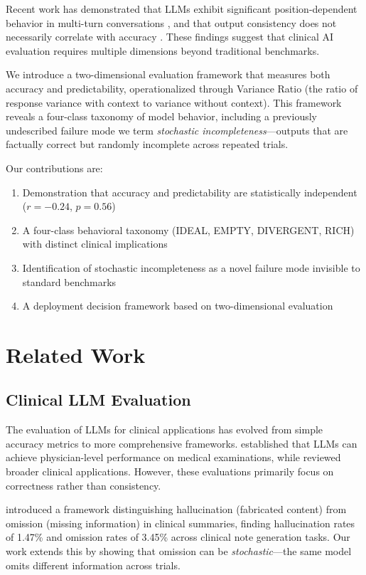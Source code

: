 \documentclass[11pt]{article}
\begin{document}
Recent work has demonstrated that LLMs exhibit significant position-dependent behavior in multi-turn conversations \citep{liu2024lost, laban2025lost}, and that output consistency does not necessarily correlate with accuracy \citep{shyr2025statistical}. These findings suggest that clinical AI evaluation requires multiple dimensions beyond traditional benchmarks.

We introduce a two-dimensional evaluation framework that measures both accuracy and predictability, operationalized through Variance Ratio (the ratio of response variance with context to variance without context). This framework reveals a four-class taxonomy of model behavior, including a previously undescribed failure mode we term \textit{stochastic incompleteness}---outputs that are factually correct but randomly incomplete across repeated trials.

Our contributions are:
\begin{enumerate}
    \item Demonstration that accuracy and predictability are statistically independent ($r = -0.24$, $p = 0.56$)
    \item A four-class behavioral taxonomy (IDEAL, EMPTY, DIVERGENT, RICH) with distinct clinical implications
    \item Identification of stochastic incompleteness as a novel failure mode invisible to standard benchmarks
    \item A deployment decision framework based on two-dimensional evaluation
\end{enumerate}

\section{Related Work}

\subsection{Clinical LLM Evaluation}

The evaluation of LLMs for clinical applications has evolved from simple accuracy metrics to more comprehensive frameworks. \citet{singhal2023large} established that LLMs can achieve physician-level performance on medical examinations, while \citet{thirunavukarasu2023large} reviewed broader clinical applications. However, these evaluations primarily focus on correctness rather than consistency.

\citet{asgari2025framework} introduced a framework distinguishing hallucination (fabricated content) from omission (missing information) in clinical summaries, finding hallucination rates of 1.47\% and omission rates of 3.45\% across clinical note generation tasks. Our work extends this by showing that omission can be \textit{stochastic}---the same model omits different information across trials.
\end{document}
